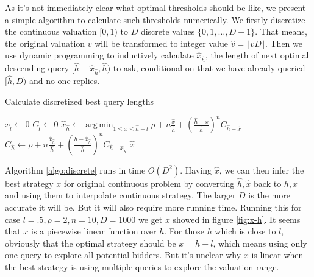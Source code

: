 As it's not immediately clear what optimal thresholds should be like, we
present a simple algorithm to calculate such thresholds numerically. We firstly
discretize the continuous valuation $[0, 1)$ to $D$ discrete values $\{0, 1, \ldots,
D-1\}$. That means, the original valuation $v$ will be transformed to integer
value $\hat v = \lfloor v D \rfloor$. Then we use dynamic programming to
inductively calculate $\hat x_{\hat h}$, the length of next optimal descending
query $[\hat h-\hat x_{\hat h}, \hat h)$ to ask, conditional on that we have
already queried $[\hat h, D)$ and no one replies.

\begin{algorithm}
    \caption{Calculate discretized best query lengths}\label{algo:discrete}
    \begin{algorithmic}[1]
        
            \State $\hat x_{\hat l} \gets 0$
            \State $C_{\hat l} \gets 0$
                \State $\hat x_{\hat h} \gets \displaystyle
                  \operatorname*{arg\,min}_{1 \leq \hat x \leq \hat h-l} \rho + n
                  \frac{\hat x}{\hat h} + (\frac{\hat h-x}{\hat h})^n C_{\hat h-\hat x}$
                \State $C_{\hat h} \gets \rho + n \frac{\hat x_{\hat h}}{\hat h} +
                  (\frac{\hat h-\hat x_{\hat h}}{\hat h})^n C_{\hat h-\hat x_{\hat h}}$
            \EndFor
            \State \Return $\hat x$
        \EndFunction
    \end{algorithmic}
\end{algorithm}

Algorithm \ref{algo:discrete} runs in time $O(D^2)$. Having $\hat x$, we can
then infer the best strategy $x$ for original continuous problem by converting
$\hat h, \hat x$ back to $h, x$ and using them to interpolate continuous
strategy.  The larger $D$ is the more accurate it will be. But it will also
require more running time.  Running this for case $l = .5, \rho = 2, n = 10, D
= 1000$ we get $x$ showed in figure \ref{fig:x-h}. It seems that $x$ is a
piecewise linear function over $h$.  For those $h$ which is close to
$l$, obviously that the optimal strategy should be $x = h - l$,
which means using only one query to explore all potential bidders. But it's
unclear why $x$ is linear when the best strategy is using multiple queries to
explore the valuation range.

